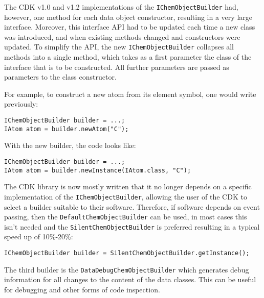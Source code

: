 \documentclass[doublespacing]{bmcart}
\begin{document}
The CDK v1.0 and v1.2 implementations of the \texttt{IChemObjectBuilder} had,
however, one method for each data object constructor, resulting in a very large
interface. Moreover, this interface API had to be updated each time a new class
was introduced, and when existing methods changed and constructors were updated.
To simplify the API, the new \texttt{IChemObjectBuilder} collapses all methods
into a single method, which takes as a first parameter the class of the
interface that is to be constructed. All further parameters are passed as
parameters to the class constructor.

For example, to construct a new atom from its element symbol, one
would write previously:

\vspace{0.2cm}
\begin{verbatim}
IChemObjectBuilder builder = ...;
IAtom atom = builder.newAtom("C");
\end{verbatim}
\vspace{0.2cm}

With the new builder, the code looks like:

\vspace{0.2cm}
\begin{verbatim}
IChemObjectBuilder builder = ...;
IAtom atom = builder.newInstance(IAtom.class, "C");
\end{verbatim}
\vspace{0.2cm}

The CDK library is now mostly written that it no longer depends on a specific
implementation of the \texttt{IChemObjectBuilder}, allowing the user of the
CDK to select a builder suitable to their software. Therefore, if software
depends on event passing, then the \texttt{DefaultChemObjectBuilder} can be
used, in most cases this isn't needed and the \texttt{SilentChemObjectBuilder} 
is preferred resulting in a typical speed up of 10\%-20\%:

\vspace{0.2cm}
\begin{verbatim}
IChemObjectBuilder builder = SilentChemObjectBuilder.getInstance();
\end{verbatim}
\vspace{0.2cm}

The third builder is the \texttt{DataDebugChemObjectBuilder} which generates debug
information for all changes to the content of the data classes. This
can be useful for debugging and other forms of code inspection.
\end{document}
